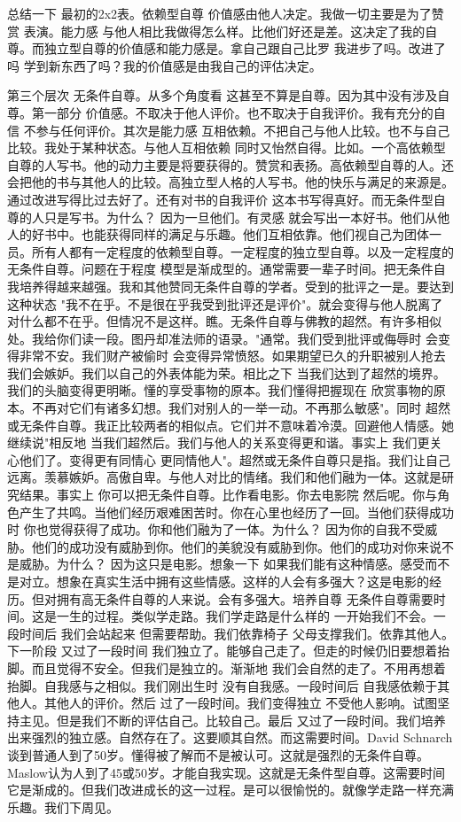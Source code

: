 总结一下 最初的2x2表。依赖型自尊 价值感由他人决定。我做一切主要是为了赞赏 表演。能力感 与他人相比我做得怎么样。比他们好还是差。这决定了我的自尊。而独立型自尊的价值感和能力感是。拿自己跟自己比罗 我进步了吗。改进了吗 学到新东西了吗？我的价值感是由我自己的评估决定。 

第三个层次 无条件自尊。从多个角度看 这甚至不算是自尊。因为其中没有涉及自尊。第一部分 价值感。不取决于他人评价。也不取决于自我评价。我有充分的自信 不参与任何评价。其次是能力感 互相依赖。不把自己与他人比较。也不与自己比较。我处于某种状态。与他人互相依赖 同时又怡然自得。比如。一个高依赖型自尊的人写书。他的动力主要是将要获得的。赞赏和表扬。高依赖型自尊的人。还会把他的书与其他人的比较。高独立型人格的人写书。他的快乐与满足的来源是。通过改进写得比过去好了。还有对书的自我评价 这本书写得真好。而无条件型自尊的人只是写书。为什么？ 因为一旦他们。有灵感 就会写出一本好书。他们从他人的好书中。也能获得同样的满足与乐趣。他们互相依靠。他们视自己为团体一员。所有人都有一定程度的依赖型自尊。一定程度的独立型自尊。以及一定程度的无条件自尊。问题在于程度 模型是渐成型的。通常需要一辈子时间。把无条件自我培养得越来越强。我和其他赞同无条件自尊的学者。受到的批评之一是。要达到这种状态 "我不在乎。不是很在乎我受到批评还是评价"。就会变得与他人脱离了 对什么都不在乎。但情况不是这样。瞧。无条件自尊与佛教的超然。有许多相似处。我给你们读一段。图丹却准法师的语录。"通常。我们受到批评或侮辱时 会变得非常不安。我们财产被偷时 会变得异常愤怒。如果期望已久的升职被别人抢去 我们会嫉妒。我们以自己的外表体能为荣。相比之下 当我们达到了超然的境界。我们的头脑变得更明晰。懂的享受事物的原本。我们懂得把握现在 欣赏事物的原本。不再对它们有诸多幻想。我们对别人的一举一动。不再那么敏感"。同时 超然或无条件自尊。我正比较两者的相似点。它们并不意味着冷漠。回避他人情感。她继续说"相反地 当我们超然后。我们与他人的关系变得更和谐。事实上 我们更关心他们了。变得更有同情心 更同情他人"。超然或无条件自尊只是指。我们让自己远离。羡慕嫉妒。高傲自卑。与他人对比的情绪。我们和他们融为一体。这就是研究结果。事实上 你可以把无条件自尊。比作看电影。你去电影院 然后呢。你与角色产生了共鸣。当他们经历艰难困苦时。你在心里也经历了一回。当他们获得成功时 你也觉得获得了成功。你和他们融为了一体。为什么？ 因为你的自我不受威胁。他们的成功没有威胁到你。他们的美貌没有威胁到你。他们的成功对你来说不是威胁。为什么？ 因为这只是电影。想象一下 如果我们能有这种情感。感受而不是对立。想象在真实生活中拥有这些情感。这样的人会有多强大？这是电影的经历。但对拥有高无条件自尊的人来说。会有多强大。培养自尊 无条件自尊需要时间。这是一生的过程。类似学走路。我们学走路是什么样的 一开始我们不会。一段时间后 我们会站起来 但需要帮助。我们依靠椅子 父母支撑我们。依靠其他人。下一阶段 又过了一段时间 我们独立了。能够自己走了。但走的时候仍旧要想着抬脚。而且觉得不安全。但我们是独立的。渐渐地 我们会自然的走了。不用再想着抬脚。自我感与之相似。我们刚出生时 没有自我感。一段时间后 自我感依赖于其他人。其他人的评价。然后 过了一段时间。我们变得独立 不受他人影响。试图坚持主见。但是我们不断的评估自己。比较自己。最后 又过了一段时间。我们培养出来强烈的独立感。自然存在了。这要顺其自然。而这需要时间。David Schnarch谈到普通人到了50岁。懂得被了解而不是被认可。这就是强烈的无条件自尊。Maslow认为人到了45或50岁。才能自我实现。这就是无条件型自尊。这需要时间 它是渐成的。但我们改进成长的这一过程。是可以很愉悦的。就像学走路一样充满乐趣。我们下周见。 

